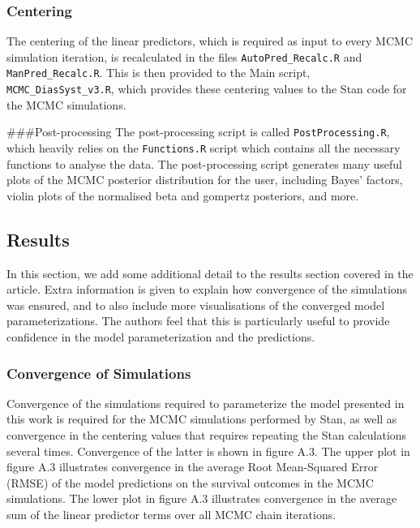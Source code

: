 \documentclass[
]{article}
\begin{document}
\hypertarget{centering}{%
\subsubsection{Centering}\label{centering}}

The centering of the linear predictors, which is required as input to
every MCMC simulation iteration, is recalculated in the files
\texttt{AutoPred\_Recalc.R} and \texttt{ManPred\_Recalc.R}. This is then
provided to the Main script, \texttt{MCMC\_DiasSyst\_v3.R}, which
provides these centering values to the Stan code for the MCMC
simulations.

\#\#\#Post-processing The post-processing script is called
\texttt{PostProcessing.R}, which heavily relies on the
\texttt{Functions.R} script which contains all the necessary functions
to analyse the data. The post-processing script generates many useful
plots of the MCMC posterior distribution for the user, including Bayes'
factors, violin plots of the normalised beta and gompertz posteriors,
and more.

\hypertarget{results}{%
\subsection{Results}\label{results}}

In this section, we add some additional detail to the results section
covered in the article. Extra information is given to explain how
convergence of the simulations was ensured, and to also include more
visualisations of the converged model parameterizations. The authors
feel that this is particularly useful to provide confidence in the model
parameterization and the predictions.

\hypertarget{convergence-of-simulations}{%
\subsubsection{Convergence of
Simulations}\label{convergence-of-simulations}}

Convergence of the simulations required to parameterize the model
presented in this work is required for the MCMC simulations performed by
Stan, as well as convergence in the centering values that requires
repeating the Stan calculations several times. Convergence of the latter
is shown in figure A.3. The upper plot in figure A.3 illustrates
convergence in the average Root Mean-Squared Error (RMSE) of the model
predictions on the survival outcomes in the MCMC simulations. The lower
plot in figure A.3 illustrates convergence in the average sum of the
linear predictor terms over all MCMC chain iterations.
\end{document}
